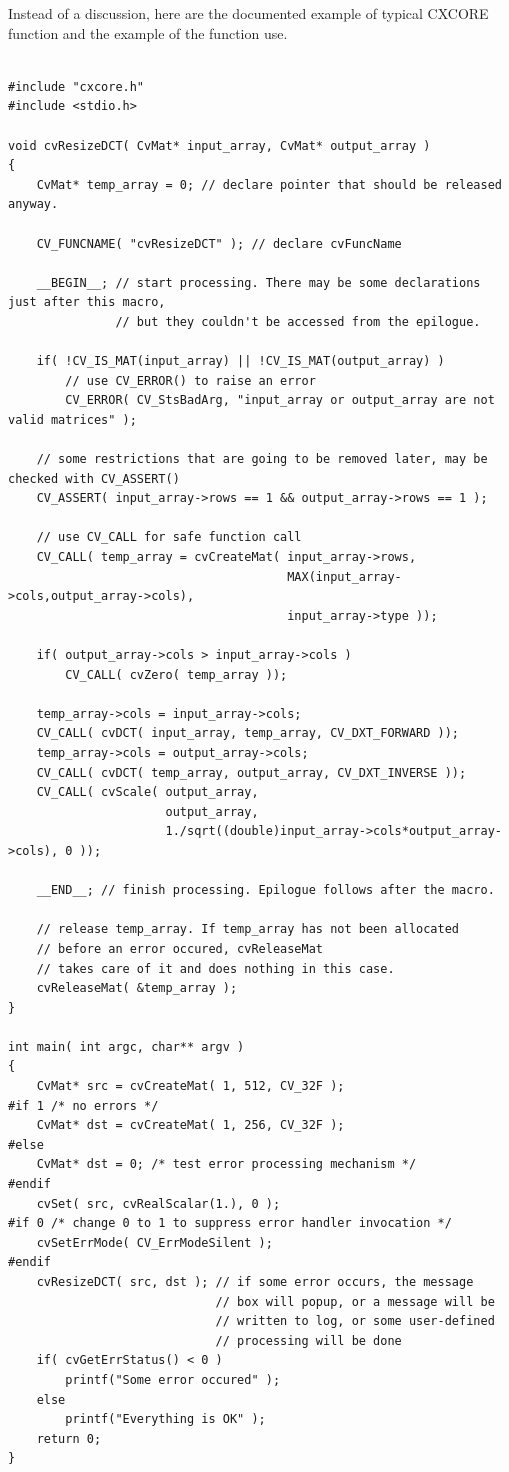 Instead of a discussion, here are the documented example of typical CXCORE function and the example of the function use.

\begin{lstlisting}

#include "cxcore.h"
#include <stdio.h>

void cvResizeDCT( CvMat* input_array, CvMat* output_array )
{
    CvMat* temp_array = 0; // declare pointer that should be released anyway.

    CV_FUNCNAME( "cvResizeDCT" ); // declare cvFuncName

    __BEGIN__; // start processing. There may be some declarations just after this macro,
               // but they couldn't be accessed from the epilogue.

    if( !CV_IS_MAT(input_array) || !CV_IS_MAT(output_array) )
        // use CV_ERROR() to raise an error
        CV_ERROR( CV_StsBadArg, "input_array or output_array are not valid matrices" );

    // some restrictions that are going to be removed later, may be checked with CV_ASSERT()
    CV_ASSERT( input_array->rows == 1 && output_array->rows == 1 );

    // use CV_CALL for safe function call
    CV_CALL( temp_array = cvCreateMat( input_array->rows,
                                       MAX(input_array->cols,output_array->cols),
                                       input_array->type ));

    if( output_array->cols > input_array->cols )
        CV_CALL( cvZero( temp_array ));

    temp_array->cols = input_array->cols;
    CV_CALL( cvDCT( input_array, temp_array, CV_DXT_FORWARD ));
    temp_array->cols = output_array->cols;
    CV_CALL( cvDCT( temp_array, output_array, CV_DXT_INVERSE ));
    CV_CALL( cvScale( output_array,
                      output_array,
                      1./sqrt((double)input_array->cols*output_array->cols), 0 ));

    __END__; // finish processing. Epilogue follows after the macro.

    // release temp_array. If temp_array has not been allocated
    // before an error occured, cvReleaseMat
    // takes care of it and does nothing in this case.
    cvReleaseMat( &temp_array );
}

int main( int argc, char** argv )
{
    CvMat* src = cvCreateMat( 1, 512, CV_32F );
#if 1 /* no errors */
    CvMat* dst = cvCreateMat( 1, 256, CV_32F );
#else
    CvMat* dst = 0; /* test error processing mechanism */
#endif
    cvSet( src, cvRealScalar(1.), 0 );
#if 0 /* change 0 to 1 to suppress error handler invocation */
    cvSetErrMode( CV_ErrModeSilent );
#endif
    cvResizeDCT( src, dst ); // if some error occurs, the message
                             // box will popup, or a message will be
                             // written to log, or some user-defined
                             // processing will be done
    if( cvGetErrStatus() < 0 )
        printf("Some error occured" );
    else
        printf("Everything is OK" );
    return 0;
}

\end{lstlisting}

